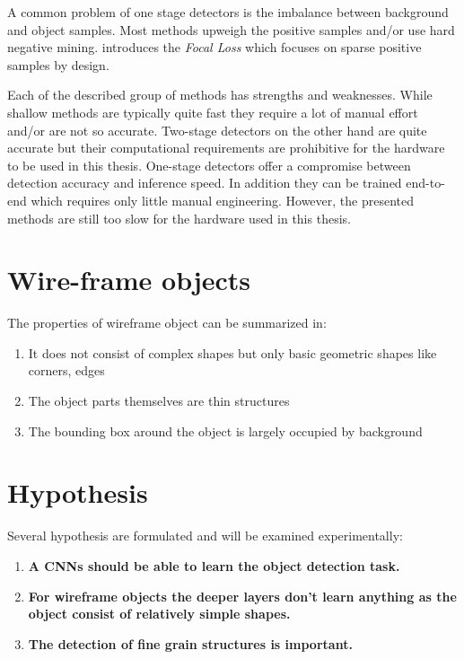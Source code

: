 	A common problem of one stage detectors is the imbalance between background and object samples. Most methods upweigh the positive samples and/or use hard negative mining. \cite{Lin} introduces the \textit{Focal Loss} which focuses on sparse positive samples by design.
	
	Each of the described group of methods has strengths and weaknesses. While shallow methods are typically quite fast they require a lot of manual effort and/or are not so accurate. Two-stage detectors on the other hand are quite accurate but their computational requirements are prohibitive for the hardware to be used in this thesis. One-stage detectors offer a compromise between detection accuracy and inference speed. In addition they can be trained end-to-end which requires only little manual engineering. However, the presented methods are still too slow for the hardware used in this thesis.






\section{Wire-frame objects}


The properties of wireframe object can be summarized in:
\begin{enumerate}
	\item It does not consist of complex shapes but only basic geometric shapes like corners, edges
	\item The object parts themselves are thin structures
	\item The bounding box around the object is largely occupied by background
\end{enumerate}


\section{Hypothesis}

Several hypothesis are formulated and will be examined experimentally:
\begin{enumerate}
	\item \textbf{A \acp{CNN} should be able to learn the object detection task.}
	\item \textbf{For wireframe objects the deeper layers don't learn anything as the object consist of relatively simple shapes.}
	\item \textbf{The detection of fine grain structures is important.}
\end{enumerate}
\newpage
